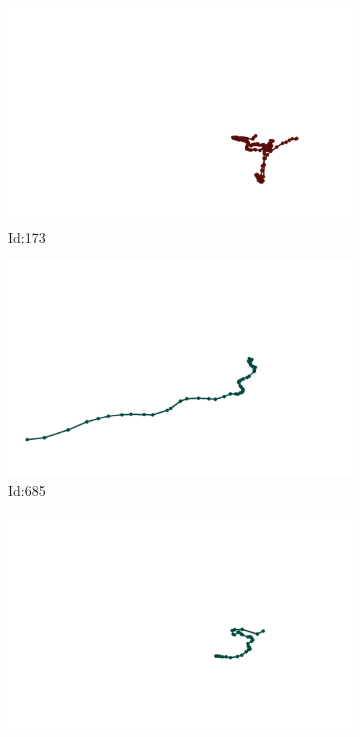 \documentclass[12pt,twoside]{report}
\begin{document}
\begin{figure}
\centering
\begin{subfigure}[b]{0.20\textwidth}
\centering
\includegraphics[width=\textwidth]{../../trajectories/173.png}
\caption{Id:173}
\end{subfigure}
\begin{subfigure}[b]{0.20\textwidth}
\centering
\includegraphics[width=\textwidth]{../../trajectories/685.png}
\caption{Id:685}
\end{subfigure}
\begin{subfigure}[b]{0.20\textwidth}
\centering
\includegraphics[width=\textwidth]{../../trajectories/776.png}

\end{subfigure}
\end{figure}
\end{document}
